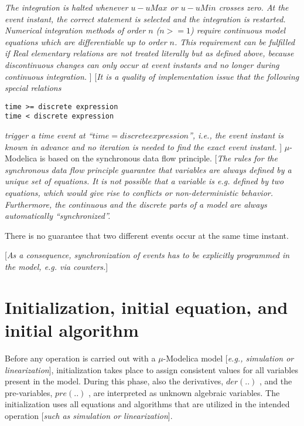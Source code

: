 \documentclass[11pt,a4paper,notitlepage]{report}
\begin{document}
\emph{The integration is halted whenever $u-uMax$ or $u-uMin$ crosses zero. At the event instant, the correct statement is selected and the integration is restarted. Numerical integration methods of order $n$ ($n>=1$) require continuous model equations which are differentiable up to order $n$. This requirement can be fulfilled if Real elementary relations are not treated literally but as defined above, because discontinuous changes can only occur at event instants and no longer during continuous integration.}
]
[\emph{It is a quality of implementation issue that the following special relations}
\begin{verbatim}
time >= discrete expression
time < discrete expression
\end{verbatim}
\emph{trigger a time event at “$time = discrete expression$”, i.e., the event instant is known in advance and no iteration is needed to find the exact event instant.}
]
$\mu$-Modelica is based on the synchronous data flow principle.
[\emph{The rules for the synchronous data flow principle guarantee that variables are always defined by a unique set of equations. It is not possible that a variable is e.g. defined by two equations, which would give rise to conflicts or non-deterministic behavior. Furthermore, the continuous and the discrete parts of a model are always automatically “synchronized”.}

There is no guarantee that two different events occur at the same time instant.

[\emph{As a consequence, synchronization of events has to be explicitly programmed in the model, e.g. via counters.}]

\section{Initialization, initial equation, and initial algorithm}\label{equations:initial}

Before any operation is carried out with a $\mu$-Modelica model [\emph{e.g., simulation or linearization}], initialization takes place to assign consistent values for all variables present in the model. During this phase, also the derivatives, $der(..)$ , and the pre-variables, $pre(..)$ , are interpreted as unknown algebraic variables. The initialization uses all equations and algorithms that are utilized in the intended operation [\emph{such as simulation or linearization}].
\end{document}
